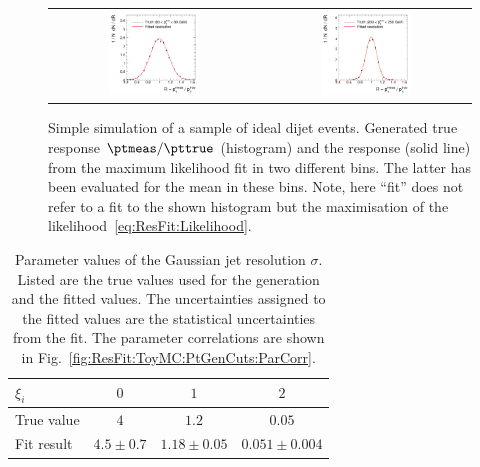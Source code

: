 \begin{figure}[ht]
  \begin{center}
    \begin{tabular}{cc}
      \includegraphics[width=0.45\textwidth]{figures/resFit_ToyMC_PtGenCuts_ResolutionBin1} &
      \includegraphics[width=0.45\textwidth]{figures/resFit_ToyMC_PtGenCuts_ResolutionBin7} \\      
    \end{tabular}
  \end{center}
  \caption{Simple simulation of a sample of ideal dijet events.
    Generated true response \mbox{$\ptmeas / \pttrue$} (histogram) and
    the response (solid line) from the maximum likelihood fit in two
    different \pttrue bins.
    The latter has been evaluated for the mean \pttrue in these bins.
    Note, here ``fit'' does not refer to a fit to the shown histogram but the maximisation of the likelihood~\eqref{eq:ResFit:Likelihood}.
  }
  \label{fig:ResFit:ToyMC:PtGenCuts:Response}
\end{figure}


\begin{table}[ht]
  \caption{Parameter values of the Gaussian jet \pt resolution
    $\sigma$.
    Listed are the true values used for the generation and
    the fitted values.
    The uncertainties assigned to the fitted values
    are the statistical uncertainties from the fit.
    The parameter correlations are shown in Fig.~\ref{fig:ResFit:ToyMC:PtGenCuts:ParCorr}.}
  \begin{center}
    \begin{tabular}[ht]{lccc}
      \toprule
      $\xi_{i}$ & $0$ & $1$ & $2$ \\
      \midrule
      True value & $4$           & $1.2$           & $0.05$ \\
      Fit result & $4.5 \pm 0.7$ & $1.18 \pm 0.05$ & $0.051 \pm 0.004$ \\
      \bottomrule
    \end{tabular}
  \end{center}
 \label{tab:ResFit:ToyMC:PtGenCuts:FitResult}
\end{table}


